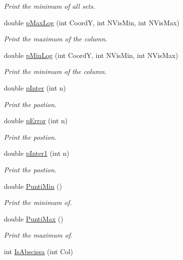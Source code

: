 \begin{DoxyCompactItemize}
\begin{DoxyCompactList}\small\item\em \-Print the minimum of all sets. \end{DoxyCompactList}\item 
double \hyperlink{classVarDatFile_abb42c2238af97f451a3ebf3226d13639}{p\-Max\-Log} (int \-Coord\-Y, int \-N\-Vis\-Min, int \-N\-Vis\-Max)
\begin{DoxyCompactList}\small\item\em \-Print the maximum of the column. \end{DoxyCompactList}\item 
double \hyperlink{classVarDatFile_af5ebcfc4c951d36ead08fdc20974b5ff}{p\-Min\-Log} (int \-Coord\-Y, int \-N\-Vis\-Min, int \-N\-Vis\-Max)
\begin{DoxyCompactList}\small\item\em \-Print the minimum of the column. \end{DoxyCompactList}\item 
double \hyperlink{classVarDatFile_ac9b6015f7712a2bffde3a609145331af}{p\-Inter} (int n)
\begin{DoxyCompactList}\small\item\em \-Print the postion. \end{DoxyCompactList}\item 
double \hyperlink{classVarDatFile_ab59237e1fbf8ee4c45f7f189799ed008}{p\-Error} (int n)
\begin{DoxyCompactList}\small\item\em \-Print the postion. \end{DoxyCompactList}\item 
double \hyperlink{classVarDatFile_a31c516fdbe042c50ffdf5d3dc74521ab}{p\-Inter1} (int n)
\begin{DoxyCompactList}\small\item\em \-Print the postion. \end{DoxyCompactList}\item 
double \hyperlink{classVarDatFile_a9998056e2576481a913421ae6e148179}{\-Punti\-Min} ()
\begin{DoxyCompactList}\small\item\em \-Print the minimum of. \end{DoxyCompactList}\item 
double \hyperlink{classVarDatFile_a0a3ba11d08ae946dfdf46d0b33047211}{\-Punti\-Max} ()
\begin{DoxyCompactList}\small\item\em \-Print the maximum of. \end{DoxyCompactList}\item 
\hypertarget{classVarDatFile_a2d7aa499f16ec4d2e15ac60bccbb8441}{int \hyperlink{classVarDatFile_a2d7aa499f16ec4d2e15ac60bccbb8441}{\-Is\-Abscissa} (int \-Col)}\label{classVarDatFile_a2d7aa499f16ec4d2e15ac60bccbb8441}


\end{DoxyCompactItemize}

